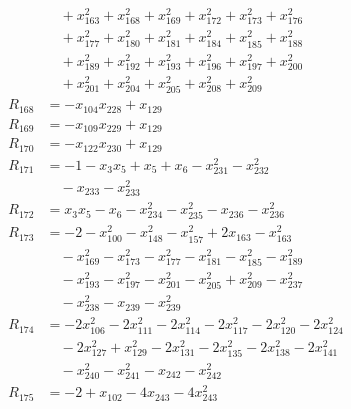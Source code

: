 \begin{align*}
&\quad{}+x_{163}^{2}+x_{168}^{2}+x_{169}^{2}+x_{172}^{2}+x_{173}^{2}+x_{176}^{2}\\
&\quad{}+x_{177}^{2}+x_{180}^{2}+x_{181}^{2}+x_{184}^{2}+x_{185}^{2}+x_{188}^{2}\\
&\quad{}+x_{189}^{2}+x_{192}^{2}+x_{193}^{2}+x_{196}^{2}+x_{197}^{2}+x_{200}^{2}\\
&\quad{}+x_{201}^{2}+x_{204}^{2}+x_{205}^{2}+x_{208}^{2}+x_{209}^{2}\\
R_{168}&=-x_{104}x_{228}+x_{129}\\
R_{169}&=-x_{109}x_{229}+x_{129}\\
R_{170}&=-x_{122}x_{230}+x_{129}\\
R_{171}&=-1-x_{3}x_{5}+x_{5}+x_{6}-x_{231}^{2}-x_{232}^{2}\\
&\quad{}-x_{233}-x_{233}^{2}\\
R_{172}&=x_{3}x_{5}-x_{6}-x_{234}^{2}-x_{235}^{2}-x_{236}-x_{236}^{2}\\
R_{173}&=-2-x_{100}^{2}-x_{148}^{2}-x_{157}^{2}+2x_{163}-x_{163}^{2}\\
&\quad{}-x_{169}^{2}-x_{173}^{2}-x_{177}^{2}-x_{181}^{2}-x_{185}^{2}-x_{189}^{2}\\
&\quad{}-x_{193}^{2}-x_{197}^{2}-x_{201}^{2}-x_{205}^{2}+x_{209}^{2}-x_{237}^{2}\\
&\quad{}-x_{238}^{2}-x_{239}-x_{239}^{2}\\
R_{174}&=-2x_{106}^{2}-2x_{111}^{2}-2x_{114}^{2}-2x_{117}^{2}-2x_{120}^{2}-2x_{124}^{2}\\
&\quad{}-2x_{127}^{2}+x_{129}^{2}-2x_{131}^{2}-2x_{135}^{2}-2x_{138}^{2}-2x_{141}^{2}\\
&\quad{}-x_{240}^{2}-x_{241}^{2}-x_{242}-x_{242}^{2}\\
R_{175}&=-2+x_{102}-4x_{243}-4x_{243}^{2}\\
\end{align*}
\endgroup
